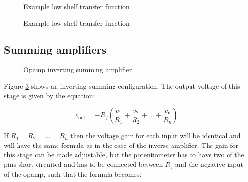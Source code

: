\begin{figure}[H]
    \center
    \caption{Example low shelf transfer function}
    \label{fig:lowshelf-freq}
\end{figure}

\begin{figure}[H]
    \center
    \caption{Example low shelf transfer function}
    \label{fig:highshelf-freq}
\end{figure}


\subsection{Summing amplifiers}

\begin{figure}[H]
    \center
    
    \caption{Opamp inverting summing amplifier}
    \label{fig:invsumamp}
\end{figure}

Figure \ref{fig:invsumamp} shows an inverting summing configuration. The output
voltage of this stage is given by the equation:

\begin{equation}
    v_\text{out} = -R_f (\frac{v_\text{1}}{R_1} +
                         \frac{v_\text{2}}{R_2} + ... +
                         \frac{v_\text{n}}{R_n})
\end{equation}

If $R_1 = R_2 = ... = R_n$ then the voltage gain for each input will be
identical and will have the same formula as in the case of the inverse
amplifier. The gain for this stage can be made adjustable, but the
potentiometer has to have two of the pins short circuited and has to be
connected between $R_f$ and the negative input of the opamp, such that the
formula becomes:

